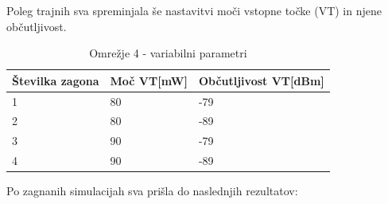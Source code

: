 \documentclass[11pt,a4paper,slovene]{myarticle}
\begin{document}
Poleg trajnih sva spreminjala še nastavitvi moči vstopne točke (VT) in njene občutljivost.
\begin{table}[h!]
	\centering
		\begin{tabular}{| l | l | l |}
			\hline
			Številka zagona & Moč VT[mW] & Občutljivost VT[dBm] \\
			\hline
			1 & 80 & -79 \\
			\hline
			2 & 80 & -89 \\
			\hline
			3 & 90 & -79 \\
			\hline
			4 & 90 & -89 \\
			\hline
		\end{tabular}
	\caption{Omrežje 4 - variabilni parametri}
	\label{tab:om3variabilniparametri}
\end{table}

Po zagnanih simulacijah sva prišla do naslednjih rezultatov:
\end{document}
